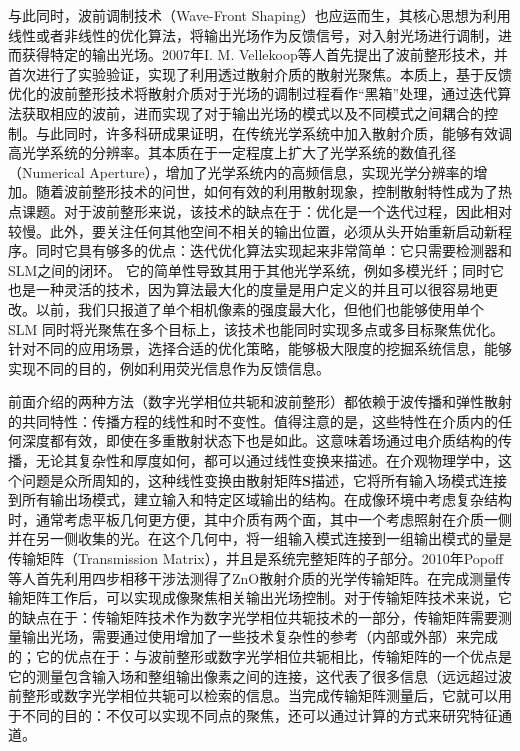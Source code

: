 与此同时，波前调制技术（Wave-Front Shaping）\cite{Vellekoop2007}也应运而生，其核心思想为利用线性或者非线性的优化算法，将输出光场作为反馈信号，对入射光场进行调制，进而获得特定的输出光场。2007年I. M. Vellekoop等人\cite{Vellekoop2007}首先提出了波前整形技术，并首次进行了实验验证，实现了利用透过散射介质的散射光聚焦。本质上，基于反馈优化的波前整形技术将散射介质对于光场的调制过程看作“黑箱”处理，通过迭代算法获取相应的波前，进而实现了对于输出光场的模式以及不同模式之间耦合的控制。与此同时，许多科研成果证明，在传统光学系统中加入散射介质，能够有效调高光学系统的分辨率\cite{vellekoop_exploiting_2010,choi_overcoming_2011}。其本质在于一定程度上扩大了光学系统的数值孔径（Numerical Aperture），增加了光学系统内的高频信息，实现光学分辨率的增加。随着波前整形技术的问世，如何有效的利用散射现象，控制散射特性成为了热点课题。对于波前整形来说，该技术的缺点在于：优化是一个迭代过程，因此相对较慢。此外，要关注任何其他空间不相关的输出位置，必须从头开始重新启动新程序。同时它具有够多的优点：迭代优化算法实现起来非常简单：它只需要检测器和SLM之间的闭环。 它的简单性导致其用于其他光学系统，例如多模光纤；同时它也是一种灵活的技术，因为算法最大化的度量是用户定义的并且可以很容易地更改。以前，我们只报道了单个相机像素的强度最大化，但他们也能够使用单个 SLM 同时将光聚焦在多个目标上，该技术也能同时实现多点或多目标聚焦优化。针对不同的应用场景，选择合适的优化策略，能够极大限度的挖掘系统信息，能够实现不同的目的，例如利用荧光信息作为反馈信息\cite{boniface_non_invasive_2019}。

前面介绍的两种方法（数字光学相位共轭和波前整形）都依赖于波传播和弹性散射的共同特性：传播方程的线性和时不变性。值得注意的是，这些特性在介质内的任何深度都有效，即使在多重散射状态下也是如此。这意味着场通过电介质结构的传播，无论其复杂性和厚度如何，都可以通过线性变换来描述。在介观物理学中，这个问题是众所周知的，这种线性变换由散射矩阵$\mathbf{S}$描述，它将所有输入场模式连接到所有输出场模式，建立输入和特定区域输出的结构。在成像环境中考虑复杂结构时，通常考虑平板几何更方便，其中介质有两个面，其中一个考虑照射在介质一侧并在另一侧收集的光。在这个几何中，将一组输入模式连接到一组输出模式的量是传输矩阵（Transmission Matrix），并且是系统完整矩阵的子部分。2010年Popoff等人\cite{Popoff2010}首先利用四步相移干涉法测得了ZnO散射介质的光学传输矩阵。在完成测量传输矩阵工作后，可以实现成像聚焦相关输出光场控制。对于传输矩阵技术来说，它的缺点在于：传输矩阵技术作为数字光学相位共轭技术的一部分，传输矩阵需要测量输出光场，需要通过使用增加了一些技术复杂性的参考（内部或外部）来完成的；它的优点在于：与波前整形或数字光学相位共轭相比，传输矩阵的一个优点是它的测量包含输入场和整组输出像素之间的连接，这代表了很多信息（远远超过波前整形或数字光学相位共轭可以检索的信息。当完成传输矩阵测量后，它就可以用于不同的目的：不仅可以实现不同点的聚焦，还可以通过计算的方式来研究特征通道。

